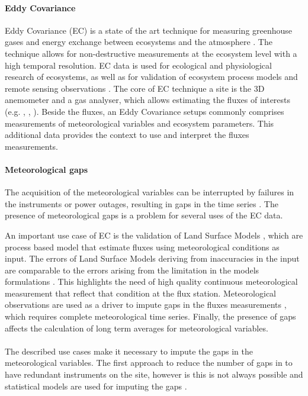 \documentclass{article}
\begin{document}
\paragraph{Eddy Covariance} Eddy Covariance (EC) is a state of the art technique for measuring greenhouse gases and energy exchange between ecosystems and the atmosphere \cite{aubinet_eddy_2012-1}.  The technique allows for non-destructive measurements at the ecosystem level with a high temporal resolution. EC data is used for ecological and physiological research of ecosystems, as well as for validation of ecosystem process models and remote sensing observations \cite{papale_ideas_2020}.
The core of EC technique a site is the 3D anemometer and a gas analyser, which allows estimating the fluxes of interests (e.g. , , ). Beside the fluxes, an Eddy Covariance setups commonly comprises measurements of meteorological variables and ecosystem parameters. This additional data provides the context to use and interpret the fluxes measurements.

\paragraph{Meteorological gaps} The acquisition of the meteorological variables can be interrupted by failures in the instruments or power outages, resulting in gaps in the time series \cite{aubinet_eddy_2012-1}.
The presence of meteorological gaps is a problem for several uses of the EC data.

An important use case of EC is the validation of Land Surface Models \cite{balzarolo_evaluating_2014, friend_fluxnet_2007-1, bonan_improving_2011-1, kramer_evaluation_2002}, which are process based model that estimate fluxes using meteorological conditions as input. The errors of Land Surface Models deriving from inaccuracies in the input are comparable to the errors arising from the limitation in the models formulations \cite{zhao_how_2012}. This highlights the need of high quality continuous meteorological measurement that reflect that condition at the flux station.
Meteorological observations are used as a driver to impute gaps in the fluxes measurements \cite{aubinet_eddy_2012-1}, which requires complete meteorological time series.
Finally, the presence of gaps affects the calculation of long term averages for meteorological variables. 

\paragraph{} The described use cases make it necessary to impute the gaps in the meteorological variables. The first approach to reduce the number of gaps in to have redundant instruments on the site, however is this is not always possible and statistical models are used for imputing the gaps \cite{aubinet_eddy_2012-1}.
\end{document}
